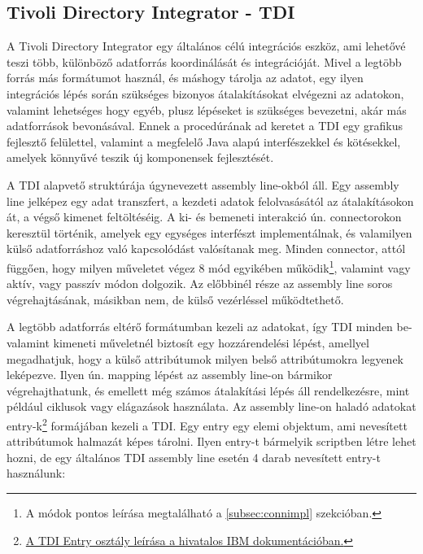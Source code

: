 \subsection{Tivoli Directory Integrator - TDI}
\label{subsec:TDI}
A Tivoli Directory Integrator egy általános célú integrációs eszköz, ami lehetővé teszi több, különböző adatforrás koordinálását és integrációját. Mivel a legtöbb forrás más formátumot használ, és máshogy tárolja az adatot, egy ilyen integrációs lépés során szükséges bizonyos átalakításokat elvégezni az adatokon, valamint lehetséges hogy egyéb, plusz lépéseket is szükséges bevezetni, akár más adatforrások bevonásával. Ennek a procedúrának ad keretet a TDI egy grafikus fejlesztő felülettel, valamint a megfelelő Java alapú interfészekkel és kötésekkel, amelyek könnyűvé teszik új komponensek fejlesztését.

A TDI alapvető struktúrája úgynevezett assembly line-okból áll. Egy assembly line jelképez egy adat transzfert, a kezdeti adatok felolvasásától az átalakításokon át, a végső kimenet feltöltéséig. A ki- és bemeneti interakció ún. connectorokon keresztül történik, amelyek egy egységes interfészt implementálnak, és valamilyen külső adatforráshoz való kapcsolódást valósítanak meg. Minden connector, attól függően, hogy milyen műveletet végez 8 mód egyikében működik\footnote{A módok pontos leírása megtalálható a \ref{subsec:connimpl} szekcióban.}, valamint vagy aktív, vagy passzív módon dolgozik. Az előbbinél része az assembly line soros végrehajtásának, másikban nem, de külső vezérléssel működtethető.

A legtöbb adatforrás eltérő formátumban kezeli az adatokat, így TDI minden be- valamint kimeneti műveletnél biztosít egy hozzárendelési lépést, amellyel megadhatjuk, hogy a külső attribútumok milyen belső attribútumokra legyenek leképezve. Ilyen ún. mapping lépést az assembly line-on bármikor végrehajthatunk, és emellett még számos átalakítási lépés áll rendelkezésre, mint például ciklusok vagy elágazások használata. Az assembly line-on haladó adatokat entry-k\footnote{\href{https://www.ibm.com/support/knowledgecenter/en/SSCQGF_7.1.0/com.ibm.IBMDI.doc_7.1/entryobject.htm}{A TDI Entry osztály leírása a hivatalos IBM dokumentációban.}} formájában kezeli a TDI. Egy entry egy elemi objektum, ami nevesített attribútumok halmazát képes tárolni. Ilyen entry-t bármelyik scriptben létre lehet hozni, de egy általános TDI assembly line esetén 4 darab nevesített entry-t használunk:

